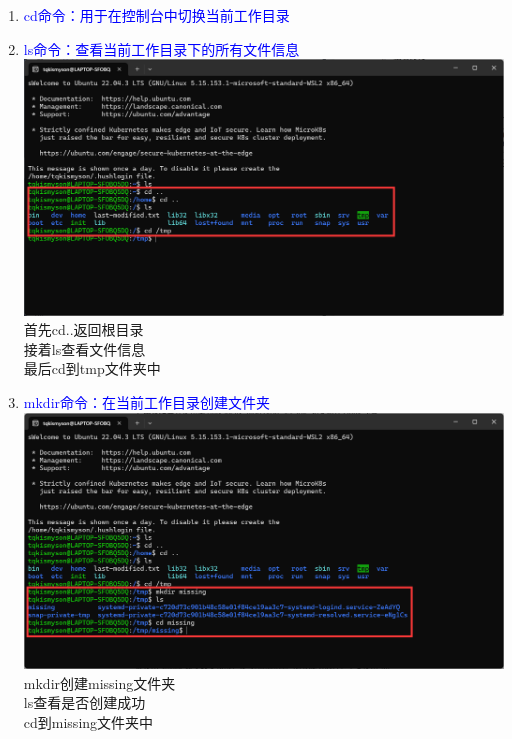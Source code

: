 \documentclass[12pt,a4paper,UTF8]{article}
\begin{document}
    \begin{enumerate}
        \item \textcolor{blue}{cd命令：用于在控制台中切换当前工作目录}\\
        \item \textcolor{blue}{ls命令：查看当前工作目录下的所有文件信息}\\[8pt]
        \includegraphics[scale=0.25]{pictures/Shell/1_1.png}
        首先cd..返回根目录\\
        接着ls查看文件信息\\
        最后cd到tmp文件夹中
        \item \textcolor{blue}{mkdir命令：在当前工作目录创建文件夹}\\[8pt]
        \includegraphics[scale=0.25]{pictures/Shell/1_2.png}
        mkdir创建missing文件夹\\
        ls查看是否创建成功\\
        cd到missing文件夹中\\
    \end{enumerate}
\end{document}
